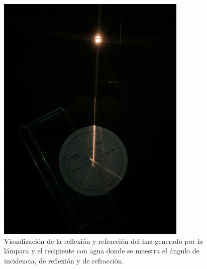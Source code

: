 \documentclass[12pt,a4paper]{article}
\begin{document}
\begin{figure}[ht]
	\begin{minipage}{0.45\linewidth}
		\includegraphics[width= 0.9 \linewidth]{IMAGENES/METODOLOGÍA/image_3}
		\caption{Visualización de la reflexión y refracción del haz generado por la lámpara y el recipiente con agua donde se muestra el ángulo de incidencia, de reflexión y de refracción.}
		\label{fig:rayo}
	\end{minipage}\hspace{5mm}
	\begin{minipage}{0.45\linewidth}

\end{minipage}
\end{figure}
\end{document}
